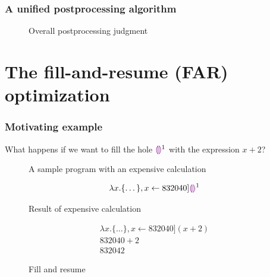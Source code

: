 \documentclass{beamer}
\begin{document}

%     

\begin{frame}
  \frametitle{A unified postprocessing algorithm}

  \begin{figure}
    \centering
    
    \caption{Overall postprocessing judgment}
    \label{fig:big-step-postprocessing-rules}
  \end{figure}
\end{frame}

\section{The fill-and-resume (FAR) optimization}

\begin{frame}[allowframebreaks]
  \frametitle{Motivating example}

  What happens if we want to fill the hole $\textcolor{violet}{\llparenthesis}\textcolor{violet}{\rrparenthesis}^1$ with the expression $x+2$?

  \begin{figure}
    \centering
    \tiny
    \caption{A sample program with an expensive calculation}
    \label{fig:far-motivation}
  \end{figure}

  \begin{figure}
    \centering
    \begin{equation*}
      [f\leftarrow [\varnothing]\lambda x.\{\dots\},x\leftarrow 832040]\hehole^1
    \end{equation*}
    \caption{Result of expensive calculation}
  \end{figure}

  \begin{figure}
    \centering
    \begin{gather*}
      [f\leftarrow [\varnothing]\lambda x.\{\dots\},x\leftarrow 832040](x+2) \\
      832040+2 \\
      832042
    \end{gather*}
    \caption{Fill and resume}
  \end{figure}
\end{frame}
\end{document}
